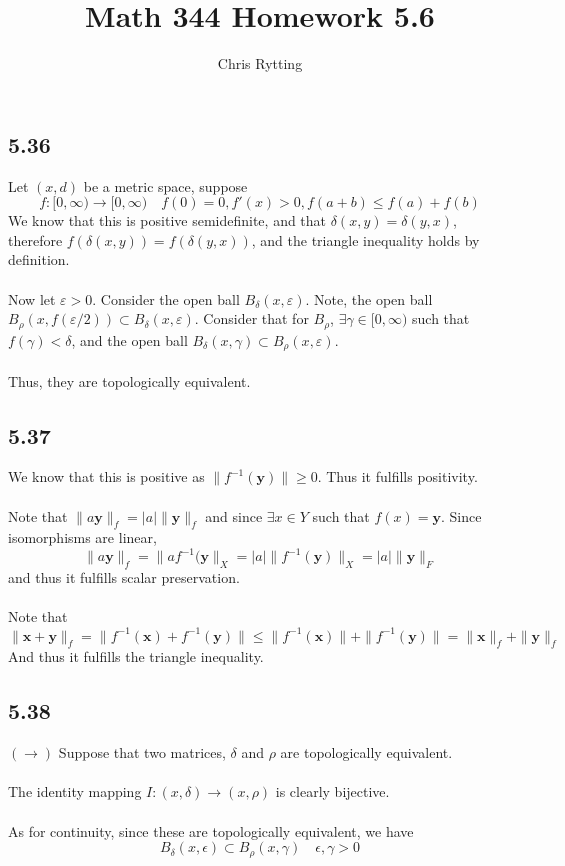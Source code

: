 \documentclass[letterpaper,12pt]{article}
\theoremstyle{definition}
\begin{document}
\title{Math 344 Homework 5.6}
\author{Chris Rytting}
\maketitle

\subsection*{5.36}
Let $(x,d)$ be a metric space, suppose 
\[f: [0, \infty ) \to [0, \infty ) \quad  f(0) = 0, f'(x) > 0, f(a+b) \leq f(a) + f(b)\]
We know that this is positive semidefinite, and that $\delta(x,y) = \delta(y,x)$, therefore $f(\delta(x,y)) = f(\delta(y,x))$, and the triangle inequality holds by definition. \\\\
Now let $\varepsilon > 0$. Consider the open ball $B_\delta(x, \varepsilon)$. Note, the open ball $B_\rho(x, f(\varepsilon/2)) \subset B_\delta(x, \varepsilon) $. Consider that for $B_\rho$, $\exists \gamma \in [0,\infty)$ such that $f(\gamma) < \delta$, and the open ball $B_\delta(x,\gamma) \subset B_\rho(x, \varepsilon)$. \\\\
Thus, they are topologically equivalent.

\subsection*{5.37}
We know that this is positive as $\| f^{-1}(\textbf{y}) \| \geq 0$. Thus it fulfills positivity. \\
\\
Note that $\| a \textbf{y}  \|_f = |a|\| \textbf{y} \| _f$ and since $\exists x \in Y$ such that $f(x) = \textbf{y}$. Since isomorphisms are linear,
\[ \| a \textbf{y} \| _f = \| a f^{-1}(\textbf{y} \|_X = |a| \| f^{-1}(\textbf{y}) \|_X = |a| \| \textbf{y} \| _F    \]
and thus it fulfills scalar preservation.\\\\
Note that
\[  \| \textbf{x} + \textbf{y} \|_f = \| f^{-1}(\textbf{x}) + f^{-1}(\textbf{y}) \| \leq \| f^{-1}(\textbf{x}) \| + \| f^{-1}(\textbf{y}) \| = \| \textbf{x} \| _f + \| \textbf{y} \| _f    \]
And thus it fulfills the triangle inequality.
\subsection*{5.38}

$(\rightarrow)$ Suppose that two matrices, $\delta$ and $\rho$ are topologically equivalent.\\\\
The identity mapping $I : (x, \delta)\rightarrow (x, \rho)$ is clearly bijective.\\\\
As for continuity, since these are topologically equivalent, we have
\[B_\delta (x, \epsilon) \subset B_\rho(x, \gamma) \quad \epsilon, \gamma > 0\]
\end{document}
